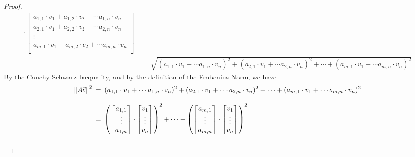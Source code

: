 \begin{proof}
\begin{align*}
{        \cdot
        \begin{bmatrix}
            a_{1,1} \cdot v_{1} + a_{1,2} \cdot v_{2} + \cdots a_{1,n} \cdot v_{n}\\
            a_{2,1} \cdot v_{1} + a_{2,2} \cdot v_{2} + \cdots a_{2,n} \cdot v_{n}\\
            \vdots\\
            a_{m,1} \cdot v_{1} + a_{m,2} \cdot v_{2} + \cdots a_{m,n} \cdot v_{n}\\
        \end{bmatrix}
        } \\[2ex]
        &= \hspace{2pt} \sqrt{(a_{1,1} \cdot v_{1} + \cdots a_{1,n} \cdot v_{n})^{2} + (a_{2,1} \cdot v_{1} + \cdots a_{2,n} \cdot v_{n})^{2} + \cdots + (a_{m,1} \cdot v_{1} + \cdots a_{m,n} \cdot v_{n})^{2}}
    \end{align*}
    By the Cauchy-Schwarz Inequality, and by the definition of the Frobenius Norm, we have
    \begin{align*}
        \norm{A\vec{v}}^{2} \hspace{2pt} &= \hspace{2pt} (a_{1,1} \cdot v_{1} + \cdots a_{1,n} \cdot v_{n})^{2} + (a_{2,1} \cdot v_{1} + \cdots a_{2,n} \cdot v_{n})^{2} + \cdots + (a_{m,1} \cdot v_{1} + \cdots a_{m,n} \cdot v_{n})^{2}\\[2ex]
        &= \hspace{2pt} \left( \begin{bmatrix}
            a_{1,1}\\
            \vdots\\
            a_{1,n}
        \end{bmatrix}
        \cdot
        \begin{bmatrix}
            v_{1}\\
            \vdots\\
            v_{n}
        \end{bmatrix} \right)^{2}
        + \cdots +
        \left( \begin{bmatrix}
            a_{m,1}\\
            \vdots\\
            a_{m,n}
        \end{bmatrix}
        \cdot
        \begin{bmatrix}
            v_{1}\\
            \vdots\\
            v_{n}
        \end{bmatrix} \right)^{2}\\[2ex]

\end{align*}
\end{proof}
